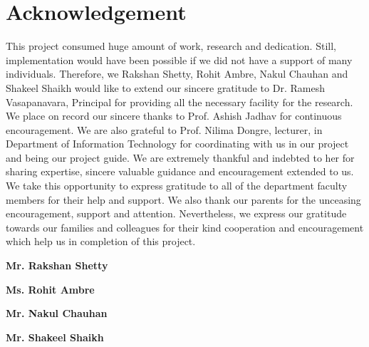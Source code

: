 \chapter*{Acknowledgement}
\hspace{0.26in}This project consumed huge amount of work, research and dedication. Still, implementation would have been possible if we did not have a support of many individuals. Therefore, we Rakshan Shetty, Rohit Ambre, Nakul Chauhan and Shakeel Shaikh would like to extend our sincere gratitude to Dr. Ramesh Vasapanavara, Principal for providing all the necessary facility for the research. We place on record our sincere thanks to Prof. Ashish Jadhav for continuous encouragement. We are also grateful to Prof. Nilima Dongre, lecturer, in Department of Information Technology for coordinating with us in our project and being our project guide. We are extremely thankful and indebted to her for sharing expertise, sincere valuable guidance and encouragement extended to us.
We take this opportunity to express gratitude to all of the department faculty members for their help and support. We also thank our parents for the unceasing encouragement, support and attention. Nevertheless, we express our gratitude towards our families and colleagues for their kind cooperation and encouragement which help us in completion of this project.

\vspace{0.5in}
\begin{flushright}
{\bf Mr. Rakshan Shetty}
\end{flushright}

\begin{flushright}
{\bf Ms. Rohit Ambre}
\end{flushright}

\begin{flushright}
{\bf Mr. Nakul Chauhan}
\end{flushright}

\begin{flushright}
{\bf Mr. Shakeel Shaikh}
\end{flushright}